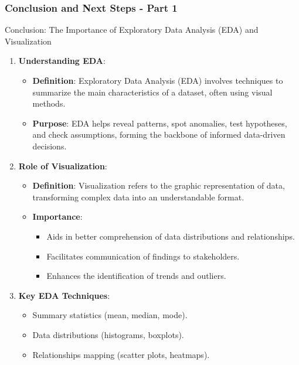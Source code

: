 \documentclass[aspectratio=169]{beamer}
\begin{document}
\begin{frame}[fragile]
    \frametitle{Conclusion and Next Steps - Part 1}
    
    \begin{block}{Conclusion: The Importance of Exploratory Data Analysis (EDA) and Visualization}
        \begin{enumerate}
            \item \textbf{Understanding EDA}:
            \begin{itemize}
                \item \textbf{Definition}: Exploratory Data Analysis (EDA) involves techniques to summarize the main characteristics of a dataset, often using visual methods.
                \item \textbf{Purpose}: EDA helps reveal patterns, spot anomalies, test hypotheses, and check assumptions, forming the backbone of informed data-driven decisions.
            \end{itemize}
            
            \item \textbf{Role of Visualization}:
            \begin{itemize}
                \item \textbf{Definition}: Visualization refers to the graphic representation of data, transforming complex data into an understandable format.
                \item \textbf{Importance}:
                \begin{itemize}
                    \item Aids in better comprehension of data distributions and relationships.
                    \item Facilitates communication of findings to stakeholders.
                    \item Enhances the identification of trends and outliers.
                \end{itemize}
            \end{itemize}
            
            \item \textbf{Key EDA Techniques}:
            \begin{itemize}
                \item Summary statistics (mean, median, mode).
                \item Data distributions (histograms, boxplots).
                \item Relationships mapping (scatter plots, heatmaps).
            \end{itemize}
        \end{enumerate}
    \end{block}
\end{frame}
\end{document}

